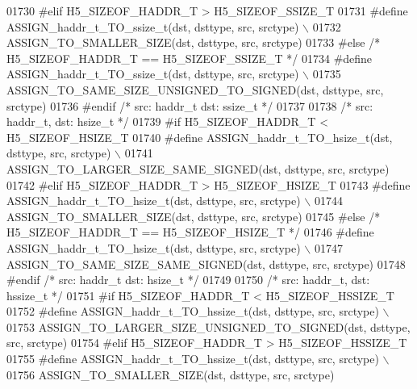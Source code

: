 \begin{DoxyCode}
01730 \textcolor{preprocessor}{#elif H5\_SIZEOF\_HADDR\_T > H5\_SIZEOF\_SSIZE\_T}
01731 \textcolor{preprocessor}{    #define ASSIGN\_haddr\_t\_TO\_ssize\_t(dst, dsttype, src, srctype) \(\backslash\)}
01732 \textcolor{preprocessor}{        ASSIGN\_TO\_SMALLER\_SIZE(dst, dsttype, src, srctype)}
01733 \textcolor{preprocessor}{#else }\textcolor{comment}{/* H5\_SIZEOF\_HADDR\_T == H5\_SIZEOF\_SSIZE\_T */}\textcolor{preprocessor}{}
01734 \textcolor{preprocessor}{    #define ASSIGN\_haddr\_t\_TO\_ssize\_t(dst, dsttype, src, srctype) \(\backslash\)}
01735 \textcolor{preprocessor}{        ASSIGN\_TO\_SAME\_SIZE\_UNSIGNED\_TO\_SIGNED(dst, dsttype, src, srctype)}
01736 \textcolor{preprocessor}{#endif }\textcolor{comment}{/* src: haddr\_t dst: ssize\_t */}\textcolor{preprocessor}{}
01737 
01738 \textcolor{comment}{/* src: haddr\_t, dst: hsize\_t */}
01739 \textcolor{preprocessor}{#if H5\_SIZEOF\_HADDR\_T < H5\_SIZEOF\_HSIZE\_T}
01740 \textcolor{preprocessor}{    #define ASSIGN\_haddr\_t\_TO\_hsize\_t(dst, dsttype, src, srctype) \(\backslash\)}
01741 \textcolor{preprocessor}{        ASSIGN\_TO\_LARGER\_SIZE\_SAME\_SIGNED(dst, dsttype, src, srctype)}
01742 \textcolor{preprocessor}{#elif H5\_SIZEOF\_HADDR\_T > H5\_SIZEOF\_HSIZE\_T}
01743 \textcolor{preprocessor}{    #define ASSIGN\_haddr\_t\_TO\_hsize\_t(dst, dsttype, src, srctype) \(\backslash\)}
01744 \textcolor{preprocessor}{        ASSIGN\_TO\_SMALLER\_SIZE(dst, dsttype, src, srctype)}
01745 \textcolor{preprocessor}{#else }\textcolor{comment}{/* H5\_SIZEOF\_HADDR\_T == H5\_SIZEOF\_HSIZE\_T */}\textcolor{preprocessor}{}
01746 \textcolor{preprocessor}{    #define ASSIGN\_haddr\_t\_TO\_hsize\_t(dst, dsttype, src, srctype) \(\backslash\)}
01747 \textcolor{preprocessor}{        ASSIGN\_TO\_SAME\_SIZE\_SAME\_SIGNED(dst, dsttype, src, srctype)}
01748 \textcolor{preprocessor}{#endif }\textcolor{comment}{/* src: haddr\_t dst: hsize\_t */}\textcolor{preprocessor}{}
01749 
01750 \textcolor{comment}{/* src: haddr\_t, dst: hssize\_t */}
01751 \textcolor{preprocessor}{#if H5\_SIZEOF\_HADDR\_T < H5\_SIZEOF\_HSSIZE\_T}
01752 \textcolor{preprocessor}{    #define ASSIGN\_haddr\_t\_TO\_hssize\_t(dst, dsttype, src, srctype) \(\backslash\)}
01753 \textcolor{preprocessor}{        ASSIGN\_TO\_LARGER\_SIZE\_UNSIGNED\_TO\_SIGNED(dst, dsttype, src, srctype)}
01754 \textcolor{preprocessor}{#elif H5\_SIZEOF\_HADDR\_T > H5\_SIZEOF\_HSSIZE\_T}
01755 \textcolor{preprocessor}{    #define ASSIGN\_haddr\_t\_TO\_hssize\_t(dst, dsttype, src, srctype) \(\backslash\)}
01756 \textcolor{preprocessor}{        ASSIGN\_TO\_SMALLER\_SIZE(dst, dsttype, src, srctype)}

\end{DoxyCode}
